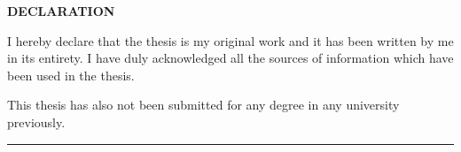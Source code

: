 \singlespace
\setcounter{page}{1}
\vspace*{\fill}

\begin{minipage}[c]{0.85 \textwidth}
\centering
\bfseries
DECLARATION
\bigskip

\normalsize
\mdseries
I hereby declare that the thesis is my original work and it has been written by me in its entirety. I have duly acknowledged all the sources of information which have been used in the thesis.
\bigskip

This thesis has also not been submitted for any degree in any university previously.\par
\bigskip


\rule{1.5in}{0.75pt}

\mdseries
\end{minipage}
\vspace*{\fill}
\newpage
